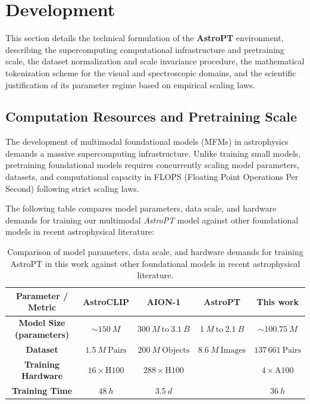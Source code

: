 \section{Development}

This section details the technical formulation of the \textbf{AstroPT} environment, describing the supercomputing computational infrastructure and pretraining scale, the dataset normalization and scale invariance procedure, the mathematical tokenization scheme for the visual and spectroscopic domains, and the scientific justification of its parameter regime based on empirical scaling laws.

\subsection{Computation Resources and Pretraining Scale}

The development of multimodal foundational models (MFMs) in astrophysics demands a massive supercomputing infrastructure. Unlike training small models, pretraining foundational models requires concurrently scaling model parameters, datasets, and computational capacity in FLOPS (Floating Point Operations Per Second) following strict scaling laws.

The following table compares model parameters, data scale, and hardware demands for training our multimodal \textit{AstroPT} model against other foundational models in recent astrophysical literature:

\begin{table}[H]
\centering
\begin{tabular}{ccccc}
\toprule
\textbf{Parameter / Metric} & \textbf{AstroCLIP} & \textbf{AION-1} & \textbf{AstroPT} & \textbf{This work} \\ 
\midrule
\textbf{Model Size (parameters)} & $\sim 150\ \si{M}$ & $300\ \si{M}\ \text{to}\ 3.1\ \si{B}$ & $1\ \si{M}\ \text{to}\ 2.1\ \si{B}$ & $\sim 100.75\ \si{M}$ \\ 
\textbf{Dataset} & $1.5\ \si{M}\ \text{Pairs}$ & $200\ \si{M}\ \text{Objects}$ & $8.6\ \si{M}\ \text{Images}$ & $137\,661\ \text{Pairs}$ \\ 
\textbf{Training Hardware} & $16 \times \text{H100} $ & $288\times \text{H100}$ &  & $4 \times \text{A100} $ \\
\textbf{Training Time} & $48\ \si{h}$ & $3.5\ \si{d}$ & & $36\ \si{h}$   \\ 
\bottomrule
\end{tabular}
\caption{Comparison of model parameters, data scale, and hardware demands for training AstroPT in this work against other foundational models in recent astrophysical literature.}
\label{tab:comparacion_modelos}
\end{table}

